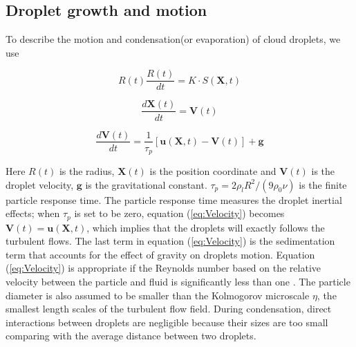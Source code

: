 \documentclass[draft,jgrga]{AGUTeX}
\begin{document}
\begin{article}
\subsection{Droplet growth and motion}

To describe the motion and condensation(or evaporation) of cloud droplets, we use

\begin{equation}
R(t)\frac{R(t)}{dt}=K\cdot S(\mathbf{X},t)\label{eq:Radius}
\end{equation}


\begin{equation}
\frac{d\mathbf{X}(t)}{dt}=\mathbf{V}(t)\label{eq:Coords}
\end{equation}


\begin{equation}
\frac{d\mathbf{V}(t)}{dt}=\frac{1}{\tau_{p}}[\mathbf{u}(\mathbf{X},t)-\mathbf{V}(t)]+\mathbf{g}\label{eq:Velocity}
\end{equation}


Here $R(t)$ is the radius, $\mathbf{X}(t)$ is the position
coordinate and $\mathbf{V}(t)$ is the droplet velocity, $\mathbf{g}$ is the gravitational constant. $\tau_{p}=2\rho_{l}R^{2}/(9\rho_{0}\nu)$ is the finite
particle response time. The particle response time measures the droplet
inertial effects; when $\tau_{p}$ is set to be zero, equation (\ref{eq:Velocity}) becomes $\mathbf{V}(t)=\mathbf{u}(\mathbf{X},t)$, which implies that the droplets will exactly follows the turbulent flows. The last term in equation (\ref{eq:Velocity}) is the sedimentation term that accounts for the effect of gravity on droplets motion. Equation (\ref{eq:Velocity}) is appropriate if the Reynolds number based on the relative velocity between the particle and fluid is significantly less than one \cite{Eaton94}. The particle
diameter is also assumed to be smaller than the Kolmogorov microscale
$\eta$, the smallest length scales of the turbulent flow field. During
condensation, direct interactions between droplets are negligible because
their sizes are too small comparing with the average distance between
two droplets.


\end{article}
\end{document}
